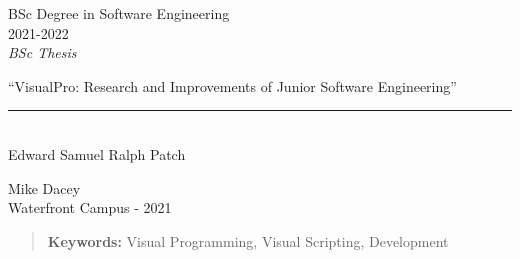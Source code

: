 \documentclass[12pt]{report} %
\begin{document}
	
\begin{titlepage}
	\begin{sffamily}
	\color{azulUC3M}
	\begin{center}
		\begin{figure}[H] %
		\end{figure}
		\vspace{2.5cm}
		\begin{Large}
			BSc Degree in Software Engineering\\			
			 2021-2022\\ %
			\vspace{2cm}		
			\textsl{BSc Thesis}
			\bigskip
			
		\end{Large}
		 	{\Huge ``VisualPro: Research and Improvements of Junior Software Engineering''}\\
		 	\vspace*{0.5cm}
	 		\rule{10.5cm}{0.1mm}\\
			\vspace*{0.9cm}
			{\LARGE Edward Samuel Ralph Patch}\\ 
			\vspace*{1cm}
		\begin{Large}
			Mike Dacey\\
			Waterfront Campus - 2021\\
		\end{Large}
	\end{center}
	\vfill
	\color{black}
	
	\end{sffamily}
\end{titlepage}

\newpage %
\thispagestyle{empty}
\mbox{}

\newpage %
\thispagestyle{empty}
\mbox{}

\renewcommand\abstractname{\large\bfseries\filcenter\uppercase{Summary}}
\begin{abstract}
\thispagestyle{plain}
\setcounter{page}{3}
	

	\textbf{Keywords:} %
		Visual Programming, Visual Scripting, Development
	\vfill
\end{abstract}
	\newpage %
	\thispagestyle{empty}
	\mbox{}
\end{document}
